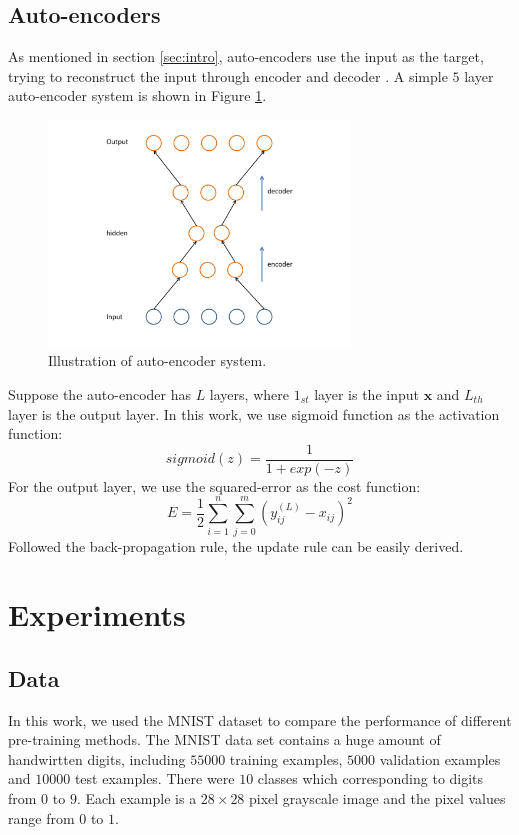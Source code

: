 \documentclass[tikz, multi,dvipsnames,svgnames,x11names]{article}
\begin{document}
\subsection{Auto-encoders}
\label{autoencoder}

As mentioned in section \ref{sec:intro}, auto-encoders use the input as the target, trying to reconstruct the input through encoder and decoder \cite{bengio2012deep}. A simple $5$ layer auto-encoder system is shown in Figure \ref{fig:autoencoder}.
\begin{figure}[htb]
\centering
\includegraphics[width=8cm]{./figures/autoencoder.pdf}
\caption{Illustration of auto-encoder system.}
\label{fig:autoencoder}
\end{figure}

Suppose the auto-encoder has $L$ layers, where $1_{st}$ layer is the input $\bm x$ and $L_{th}$ layer is the output layer. In this work, we use sigmoid function as the activation function:
\begin{equation}
sigmoid(z) = \frac{1}{1 + exp(-z)}
\end{equation}
For the output layer, we use the squared-error as the cost function:
\begin{equation}
E = \frac{1}{2}\sum_{i=1}^n \sum_{j=0}^m (y_{ij}^{(L)} - x_{ij})^2
\end{equation}
Followed the back-propagation rule, the update rule can be easily derived.


\section{Experiments}
\label{sec:experiment}

\subsection{Data}
\label{data}
In this work, we used the MNIST dataset \cite{lecun1998gradient} to compare the performance of different pre-training methods. The MNIST data set contains a huge amount of handwirtten digits, including $55000$ training examples, $5000$ validation examples and $10000$ test examples. There were $10$ classes which corresponding to digits from $0$ to $9$. Each example is a $28 \times 28$ pixel grayscale image and the pixel values range from $0$ to $1$.
\end{document}
